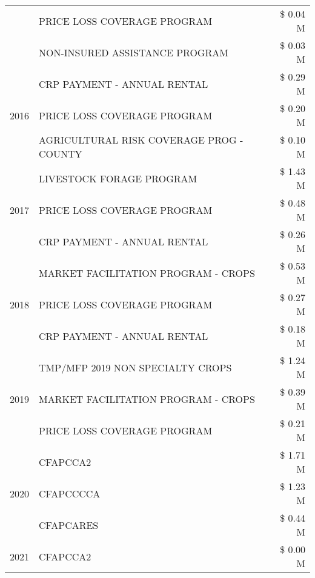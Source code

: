 \begin{tabular}{llr}
 & PRICE LOSS COVERAGE PROGRAM & \$ 0.04 M \\
 & NON-INSURED ASSISTANCE PROGRAM & \$ 0.03 M \\
\cline{1-3}
\multirow[t]{3}{*}{2016} & CRP PAYMENT - ANNUAL RENTAL                   & \$ 0.29 M \\
 & PRICE LOSS COVERAGE PROGRAM                   & \$ 0.20 M \\
 & AGRICULTURAL RISK COVERAGE PROG - COUNTY      & \$ 0.10 M \\
\cline{1-3}
\multirow[t]{3}{*}{2017} & LIVESTOCK FORAGE PROGRAM & \$ 1.43 M \\
 & PRICE LOSS COVERAGE PROGRAM & \$ 0.48 M \\
 & CRP PAYMENT - ANNUAL RENTAL & \$ 0.26 M \\
\cline{1-3}
\multirow[t]{3}{*}{2018} & MARKET FACILITATION PROGRAM - CROPS & \$ 0.53 M \\
 & PRICE LOSS COVERAGE PROGRAM & \$ 0.27 M \\
 & CRP PAYMENT - ANNUAL RENTAL & \$ 0.18 M \\
\cline{1-3}
\multirow[t]{3}{*}{2019} & TMP/MFP 2019 NON SPECIALTY CROPS & \$ 1.24 M \\
 & MARKET FACILITATION PROGRAM - CROPS & \$ 0.39 M \\
 & PRICE LOSS COVERAGE PROGRAM & \$ 0.21 M \\
\cline{1-3}
\multirow[t]{3}{*}{2020} & CFAPCCA2 & \$ 1.71 M \\
 & CFAPCCCCA & \$ 1.23 M \\
 & CFAPCARES & \$ 0.44 M \\
\cline{1-3}
2021 & CFAPCCA2 & \$ 0.00 M \\
\cline{1-3}
\bottomrule
\end{tabular}
